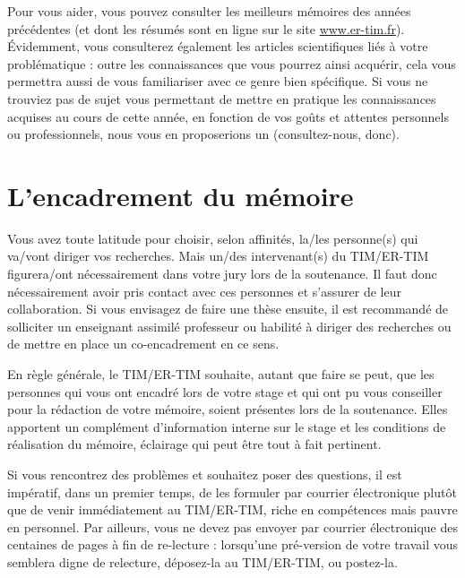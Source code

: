 Pour vous aider, vous pouvez consulter les meilleurs mémoires des années précédentes (et dont les résumés sont en ligne sur le site \url{www.er-tim.fr}). \'Evidemment, vous consulterez également les articles scientifiques liés à votre problématique : outre les connaissances que vous pourrez ainsi acquérir, cela vous permettra aussi de vous familiariser avec ce genre bien spécifique. Si vous ne trouviez pas de sujet vous permettant de mettre en pratique les connaissances acquises au cours de cette année, en fonction de vos goûts et attentes personnels ou professionnels, nous vous en proposerions un (consultez-nous, donc).

\section{L'encadrement du mémoire}
Vous avez toute latitude pour choisir, selon affinités, la/les personne(s) qui va/vont diriger vos recherches. Mais un/des intervenant(s) du TIM/ER-TIM figurera/ont nécessairement dans votre jury lors de la soutenance. Il faut donc nécessairement avoir pris contact avec ces personnes et s'assurer de leur collaboration. Si vous envisagez de faire une thèse ensuite, il est recommandé de solliciter un enseignant assimilé professeur ou habilité à diriger des recherches ou de mettre en place un co-encadrement en ce sens.

En règle générale, le TIM/ER-TIM souhaite, autant que faire se peut, que les personnes qui vous ont encadré lors de votre stage et qui ont pu vous conseiller pour la rédaction de votre mémoire, soient présentes lors de la soutenance. Elles apportent un complément d'information interne sur le stage et les conditions de réalisation du mémoire, éclairage qui peut être tout à fait pertinent.

Si vous rencontrez des problèmes et souhaitez poser des questions, il est impératif, dans un premier temps, de les formuler par courrier électronique plutôt que de venir immédiatement au TIM/ER-TIM, riche en compétences mais pauvre en personnel. Par ailleurs, vous ne devez pas envoyer par courrier électronique des centaines de pages à fin de re-lecture : lorsqu'une pré-version de votre travail vous semblera digne de relecture, déposez-la au TIM/ER-TIM, ou postez-la.

